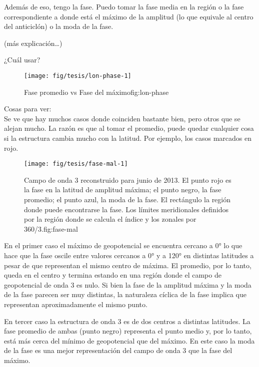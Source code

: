 \documentclass[spanish,a4paper]{book}
\begin{document}
Además de eso, tengo la fase. Puedo tomar la fase media en la región o
la fase correspondiente a donde está el máximo de la amplitud (lo que
equivale al centro del anticiclón) o la moda de la fase.

(más explicación\ldots{})

¿Cuál usar?

\begin{figure}

{\centering \texttt{[image: fig/tesis/lon-phase-1]} 

}

\caption{Fase promedio vs Fase del máximo{fig:lon-phase}}\label{fig:lon-phase}
\end{figure}

Cosas para ver:\\
Se ve que hay muchos casos donde coinciden bastante bien, pero otros que
se alejan mucho. La razón es que al tomar el promedio, puede quedar
cualquier cosa si la estructura cambia mucho con la latitud. Por
ejemplo, los casos marcados en rojo.

\begin{figure}
\texttt{[image: fig/tesis/fase-mal-1]} \caption{Campo de onda 3 reconstruido para junio de 2013. El punto rojo es la fase en la latitud de amplitud máxima; el punto negro, la fase promedio; el punto azul, la moda de la fase. El rectángulo la región donde puede encontrarse la fase. Los límites meridionales definidos por la región donde se calcula el índice y los zonales por 360/3.{fig:fase-mal}}\label{fig:fase-mal}
\end{figure}

En el primer caso el máximo de geopotencial se encuentra cercano a 0° lo
que hace que la fase oscile entre valores cercanos a 0° y a 120° en
distintas latitudes a pesar de que representan el mismo centro de
máxima. El promedio, por lo tanto, queda en el centro y termina estando
en una región donde el campo de geopotencial de onda 3 es nulo. Si bien
la fase de la amplitud máxima y la moda de la fase parecen ser muy
distintas, la naturaleza cíclica de la fase implica que representan
aproximadamente el mismo punto.

En tercer caso la estructura de onda 3 es de dos centros a distintas
latitudes. La fase promedio de ambas (punto negro) representa el punto
medio y, por lo tanto, está más cerca del mínimo de geopotencial que del
máximo. En este caso la moda de la fase es una mejor representación del
campo de onda 3 que la fase del máximo.
\end{document}
